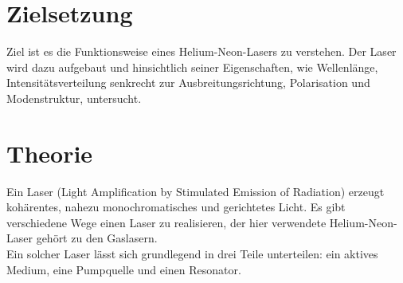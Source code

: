 \section{Zielsetzung}
\label{sec:Zielsetzung}
Ziel ist es die Funktionsweise eines Helium-Neon-Lasers zu verstehen. Der Laser wird dazu aufgebaut und hinsichtlich seiner Eigenschaften, wie Wellenlänge, Intensitätsverteilung
senkrecht zur Ausbreitungsrichtung, Polarisation und Modenstruktur, untersucht.

\section{Theorie}
\label{sec:Theorie}
Ein Laser (Light Amplification by Stimulated Emission of Radiation) erzeugt kohärentes, nahezu monochromatisches und gerichtetes Licht. Es gibt verschiedene Wege einen Laser
zu realisieren, der hier verwendete Helium-Neon-Laser gehört zu den Gaslasern.\\
Ein solcher Laser lässt sich grundlegend in drei Teile unterteilen: ein aktives Medium, eine Pumpquelle und einen Resonator.\\

